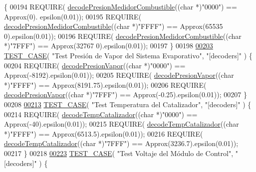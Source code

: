 \begin{DoxyCode}
{       \{
00194     REQUIRE( \hyperlink{decoders_8cpp_a228605d8cad0901a691ba4155a2326fc}{decodePresionMedidorCombustible}((\textcolor{keywordtype}{char} *)\textcolor{stringliteral}{"0000"}) == Approx(0).
      epsilon(0.01));
00195     REQUIRE( \hyperlink{decoders_8cpp_a228605d8cad0901a691ba4155a2326fc}{decodePresionMedidorCombustible}((\textcolor{keywordtype}{char} *)\textcolor{stringliteral}{"FFFF"}) == Approx(65535
      0).epsilon(0.01));
00196     REQUIRE( \hyperlink{decoders_8cpp_a228605d8cad0901a691ba4155a2326fc}{decodePresionMedidorCombustible}((\textcolor{keywordtype}{char} *)\textcolor{stringliteral}{"7FFF"}) == Approx(32767
      0).epsilon(0.01));
00197 \}
00198 
\hyperlink{UnitTestCase_8cpp_a0a88bc70e4d8ddcd9617e864ec5a4f05}{00203} \hyperlink{UnitTestCase_8cpp_a094ceea8956a9b495823bde621ea759a}{TEST\_CASE}( \textcolor{stringliteral}{"Test Presión de Vapor del Sistema Evaporativo"}, \textcolor{stringliteral}{"[decoders]"} ) \{
00204     REQUIRE( \hyperlink{decoders_8cpp_ab86bda1fcefda784e048796e2d892475}{decodePresionVapor}((\textcolor{keywordtype}{char} *)\textcolor{stringliteral}{"0000"}) == Approx(-8192).epsilon(0.01));
00205     REQUIRE( \hyperlink{decoders_8cpp_ab86bda1fcefda784e048796e2d892475}{decodePresionVapor}((\textcolor{keywordtype}{char} *)\textcolor{stringliteral}{"FFFF"}) == Approx(8191.75).epsilon(0.01));
00206     REQUIRE( \hyperlink{decoders_8cpp_ab86bda1fcefda784e048796e2d892475}{decodePresionVapor}((\textcolor{keywordtype}{char} *)\textcolor{stringliteral}{"7FFF"}) == Approx(-0.25).epsilon(0.01));
00207 \}
00208 
\hyperlink{UnitTestCase_8cpp_a4203cd502f06e1bb0b83e603e04c10cf}{00213} \hyperlink{UnitTestCase_8cpp_a094ceea8956a9b495823bde621ea759a}{TEST\_CASE}( \textcolor{stringliteral}{"Test Temperatura del Catalizador"}, \textcolor{stringliteral}{"[decoders]"} ) \{
00214     REQUIRE( \hyperlink{decoders_8cpp_a8251853ca2e5b8b2e88c75f50d53bc8d}{decodeTempCatalizador}((\textcolor{keywordtype}{char} *)\textcolor{stringliteral}{"0000"}) == Approx(-40).epsilon(0.01));
00215     REQUIRE( \hyperlink{decoders_8cpp_a8251853ca2e5b8b2e88c75f50d53bc8d}{decodeTempCatalizador}((\textcolor{keywordtype}{char} *)\textcolor{stringliteral}{"FFFF"}) == Approx(6513.5).epsilon(0.01));
00216     REQUIRE( \hyperlink{decoders_8cpp_a8251853ca2e5b8b2e88c75f50d53bc8d}{decodeTempCatalizador}((\textcolor{keywordtype}{char} *)\textcolor{stringliteral}{"7FFF"}) == Approx(3236.7).epsilon(0.01));
00217 \}
00218 
\hyperlink{UnitTestCase_8cpp_a358bfaf15b84777b24d4304fb9c2f88b}{00223} \hyperlink{UnitTestCase_8cpp_a094ceea8956a9b495823bde621ea759a}{TEST\_CASE}( \textcolor{stringliteral}{"Test Voltaje del Módulo de Control"}, \textcolor{stringliteral}{"[decoders]"} ) \{
}
\end{DoxyCode}
